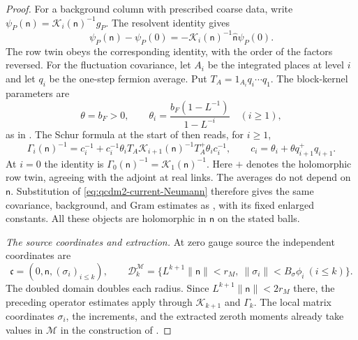\documentclass[11pt,letterpaper,reqno]{amsart}
\theoremstyle{definition}
\theoremstyle{remark}
\begin{document}
\begin{proof}
For a background column with prescribed coarse data,
write $\psi_P(\mathsf n)=\mathcal K_i(\mathsf n)^{-1}g_P$.
The resolvent identity gives
\begin{equation}\label{eq:qcdm2-current-background-change}
 \psi_P(\mathsf n)-\psi_P(0)
 =-\mathcal K_i(\mathsf n)^{-1}
                    \hat{\mathsf n}\psi_P(0).
\end{equation}
The row twin obeys the corresponding identity, with the
order of the factors reversed. For the fluctuation
covariance, let $A_i$ be the integrated places at level $i$
and let $q_i$ be the one-step fermion average. Put
$T_A=1_{A_i}q_i\cdots q_1$. The block-kernel parameters are
\[
 \theta=b_F>0,\qquad
 \theta_i=\frac{b_F(1-L^{-1})}{1-L^{-i}}\quad(i\ge1),
\]
as in \cite[Lem. 5.4]{QCDM1}.
The Schur formula at the start of \cite[Section 6]{QCDM1}
then reads, for $i\ge1$,
\[
 \Gamma_i(\mathsf n)^{-1}
 =c_i^{-1}+c_i^{-1}\theta_iT_A
       \mathcal K_{i+1}(\mathsf n)^{-1}T_A^+
                         \theta_ic_i^{-1},
 \qquad c_i=\theta_i+\theta q_{i+1}^+q_{i+1}.
\]
At $i=0$ the identity is
$\Gamma_0(\mathsf n)^{-1}=\mathcal K_1(\mathsf n)^{-1}$.
Here $+$ denotes the holomorphic row twin, agreeing
with the adjoint at real links. The averages do
not depend on $\mathsf n$. Substitution of
\eqref{eq:qcdm2-current-Neumann} therefore gives the
same covariance, background, and Gram estimates as
\cite[Prop. 6.7]{QCDM1}, with its fixed enlarged
constants. All these objects are holomorphic in
$\mathsf n$ on the stated balls.

\emph{The source coordinates and extraction.}
At zero gauge source the independent coordinates are
\[
 \mathfrak c=(0,\mathsf n,(\sigma_i)_{i\le k}),\qquad
 \mathscr D_k^{\mathcal M}
 =\{L^{k+1}\|\mathsf n\|<r_M,
        \ \|\sigma_i\|<B_\sigma\phi_i\ (i\le k)\}.
\]
The doubled domain doubles each radius. Since
$L^{k+1}\|\mathsf n\|<2r_M$ there, the preceding
operator estimates apply through $\mathcal K_{k+1}$
and $\Gamma_k$. The local matrix coordinates
$\sigma_i$, the increments, and the extracted zeroth
moments already take values in $\mathcal M$ in the
construction of \cite[Prop. 10.1]{QCDM1}.


\end{proof}
\end{document}
